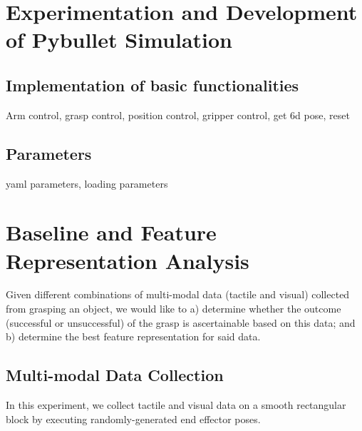 \documentclass[11pt, a4paper]{report}
\theoremstyle{definition}
\begin{document}
\chapter{Experimentation and Development of Pybullet Simulation}
\label{chap:3}

\section{Implementation of basic functionalities}
Arm control, grasp control, position control, gripper control, get 6d pose, reset

\section{Parameters}
yaml parameters, loading parameters


\chapter{Baseline and Feature Representation Analysis}
\label{chap:4}
Given different combinations of multi-modal data (tactile and visual) collected from grasping an object, we would like to a) determine whether the outcome (successful or unsuccessful) of the grasp is ascertainable based on this data; and b) determine the best feature representation for said data.

\section{Multi-modal Data Collection}
\label{sec:4.1}
In this experiment, we collect tactile and visual data on a smooth rectangular block by executing randomly-generated end effector poses.
\end{document}
